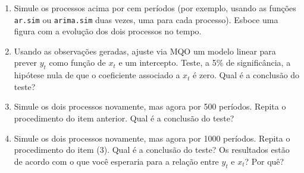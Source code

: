 \documentclass[10pt,a4paper]{article}
\begin{document}
			\begin{enumerate}
				\item Simule os processos acima por cem períodos (por exemplo, usando as funções \texttt{ar.sim} ou \texttt{arima.sim} duas vezes, uma para cada processo). Esboce uma figura com a evolução dos dois processos no tempo.
				\item Usando as observações geradas, ajuste via MQO um modelo linear para prever $y_t$ como função de $x_t$ e um intercepto. Teste, a 5\% de significância, a hipótese nula de que o coeficiente associado a $x_t$ é zero. Qual é a conclusão do teste?
				\item Simule os dois processos novamente, mas agora por 500 períodos. Repita o procedimento do item anterior. Qual é a conclusão do teste?
						\item Simule os dois processos novamente, mas agora por 1000 períodos. Repita o procedimento do item (3). Qual é a conclusão do teste? Os resultados estão de acordo com o que você esperaria para a relação entre $y_t$ e $x_t$? Por quê?
			\end{enumerate}
			
\end{document}
